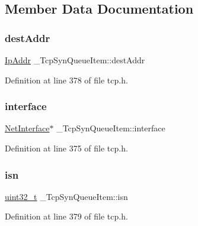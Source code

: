 \subsection{Member Data Documentation}
\mbox{\label{struct__TcpSynQueueItem_a6187af43e120966851c614da06753e2c}} 
\subsubsection{\texorpdfstring{dest\+Addr}{destAddr}}
{\footnotesize\ttfamily \hyperlink{structIpAddr}{Ip\+Addr} \+\_\+\+Tcp\+Syn\+Queue\+Item\+::dest\+Addr}



Definition at line 378 of file tcp.\+h.

\mbox{\label{struct__TcpSynQueueItem_a547cb108888dc5c24d68f917429f0c94}} 
\subsubsection{\texorpdfstring{interface}{interface}}
{\footnotesize\ttfamily \hyperlink{net_8h_a2234db8911a1148c9159979d8f5e0d6b}{Net\+Interface}$\ast$ \+\_\+\+Tcp\+Syn\+Queue\+Item\+::interface}



Definition at line 375 of file tcp.\+h.

\mbox{\label{struct__TcpSynQueueItem_a9b4eaa2fcb2b66297f2b4439ecacbd24}} 
\subsubsection{\texorpdfstring{isn}{isn}}
{\footnotesize\ttfamily \hyperlink{stdint_8h_a435d1572bf3f880d55459d9805097f62}{uint32\+\_\+t} \+\_\+\+Tcp\+Syn\+Queue\+Item\+::isn}



Definition at line 379 of file tcp.\+h.

